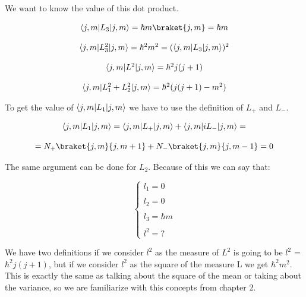 We want to know the value of this dot product.

\begin{equation}
  \begin{array}{c}
    \bra{j,m}L_3\ket{j,m} = \hbar m \braket{j,m} = \hbar m
    \\

    \\
    \bra{j,m}L_3^2\ket{j,m} = \hbar^2 m^2 = (\bra{j,m}L_3\ket{j,m})^2
    \\

    \\
    \bra{j,m}L^2\ket{j,m} = \hbar^2 j(j+1)
    \\

    \\
    \bra{j,m}L_1^2 + L_2^2\ket{j,m} = \hbar^2 ( j(j+1) - m^2 )
  \end{array}
\end{equation}

To get the value of $\langle j,m\rvert L_1\lvert j,m\rangle$ we have to use the definition of $L_+$ and $L_-$.

\begin{equation}
  \begin{array}{c}
    \bra{j,m}L_1\ket{j,m} = \bra{j,m}L_+\ket{j,m} + \bra{j,m}iL_-\ket{j,m} =
    \\

    \\
    = N_+ \braket{j,m}{j,m+1} + N_- \braket{j,m}{j,m-1} = 0
  \end{array}
\end{equation}

The same argument can be done for $L_2$. Because of this we can say that:

\begin{equation}\left\{
  \begin{array}{c}
    l_1 = 0
    \\

    \\
    l_2 = 0
    \\

    \\
    l_3 = \hbar m
    \\

    \\
    l^2 = ?
  \end{array}\right.
\end{equation}

We have two definitions if we consider $l^2$ as the measure of $L^2$ is going to be $l^2$ = $\hbar^2 j(j+1)$, but if we consider $l^2$ as the square of the measure L we get $\hbar^2 m^2$. This is exactly the same as talking about the square of the mean or taking about the variance, so we are familiarize with this concepts from chapter 2.

